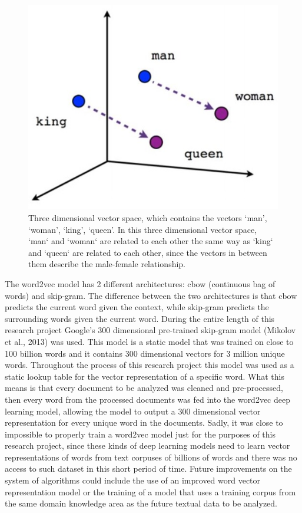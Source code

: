 \documentclass{sig-alternate}
\begin{document}
\begin{figure}
\centering
\includegraphics[scale=0.60]{images/vectorSpace.JPG}
\caption{Three dimensional vector space, which contains the vectors `man', `woman', `king', `queen'. In this three dimensional vector space,  `man` and `woman` are related to each other the same way as `king` and `queen` are related to each other, since the vectors in between them describe the male-female relationship.}
\end{figure}

The word2vec model has 2 different architectures: cbow (continuous bag of words) and skip-gram. The difference between the two architectures is that cbow predicts the current word given the context, while skip-gram predicts the surrounding words given the current word. During the entire length of this research project Google's 300 dimensional pre-trained skip-gram model (Mikolov et al., 2013) was used. This model is a static model that was trained on close to 100 billion words and it contains 300 dimensional vectors for 3 million unique words. 
Throughout the process of this research project this model was used as a static lookup table for the vector representation of a specific word. What this means is that every document to be analyzed was cleaned and pre-processed, then every word from the processed documents was fed into the word2vec deep learning model, allowing the model to output a 300 dimensional vector representation for every unique word in the documents. Sadly, it was close to impossible to properly train a word2vec model just for the purposes of this research project, since these kinds of deep learning models need to learn vector representations of words from text corpuses of billions of words and there was no access to such dataset in this short period of time. Future improvements on the system of algorithms could include the use of an improved word vector representation model or the training of a model that uses a training corpus from the same domain knowledge area as the future textual data to be analyzed.
\end{document}
